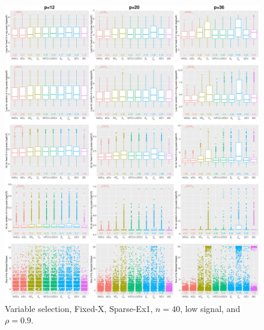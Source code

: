 \begin{figure}[!ht]
\centering
\includegraphics[width=\textwidth]{figures/supplement/fixedx/subset_selection/Sparse-Ex1_n40_lsnr_rho09.eps}
\caption{Variable selection, Fixed-X, Sparse-Ex1, $n=40$, low signal, and $\rho=0.9$.}
\end{figure}
\clearpage
